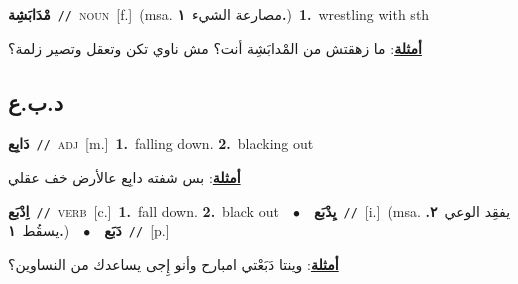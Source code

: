 \documentclass[10pt,a4paper,twoside]{article} %
\begin{document}
\begin{multicols}{2}
{{{{\setlength\topsep{0pt}\textbf{\foreignlanguage{arabic}{مْدَابَشِة}}\ {\color{gray}\texttt{//}\color{black}}\ \textsc{noun}\ [f.]\ \color{gray}(msa. \foreignlanguage{arabic}{مصارعة الشيء}~\foreignlanguage{arabic}{\textbf{١.}})\color{black}\ \textbf{1.}~wrestling with sth\  \begin{flushright}\color{gray}\foreignlanguage{arabic}{\textbf{\underline{\foreignlanguage{arabic}{أمثلة}}}: ما زهقتش من المْدابَشِة أنت؟ مش ناوي تكن وتعقل وتصير زلمة؟}\end{flushright}\color{black}} \vspace{2mm}

\vspace{-3mm}
\subsection*{\color{blue}\foreignlanguage{arabic}{د.ب.ع}\color{blue}{}} 

{\setlength\topsep{0pt}\textbf{\foreignlanguage{arabic}{دَابِع}}\ {\color{gray}\texttt{//}\color{black}}\ \textsc{adj}\ [m.]\ \textbf{1.}~falling down.  \textbf{2.}~blacking out\  \begin{flushright}\color{gray}\foreignlanguage{arabic}{\textbf{\underline{\foreignlanguage{arabic}{أمثلة}}}: بس شفته دابِع عالأرض خف عقلي}\end{flushright}\color{black}} \vspace{2mm}

{\setlength\topsep{0pt}\textbf{\foreignlanguage{arabic}{اِدْبَع}}\ {\color{gray}\texttt{//}\color{black}}\ \textsc{verb}\ [c.]\ \textbf{1.}~fall down.  \textbf{2.}~black out\ \ $\bullet$\ \ \setlength\topsep{0pt}\textbf{\foreignlanguage{arabic}{يِدْبَع}}\ {\color{gray}\texttt{//}\color{black}}\ [i.]\ \color{gray}(msa. \foreignlanguage{arabic}{يفقِد الوعي}~\foreignlanguage{arabic}{\textbf{٢.}}  \foreignlanguage{arabic}{يسقُط}~\foreignlanguage{arabic}{\textbf{١.}})\color{black}\ \ $\bullet$\ \ \setlength\topsep{0pt}\textbf{\foreignlanguage{arabic}{دَبَع}}\ {\color{gray}\texttt{//}\color{black}}\ [p.]\  \begin{flushright}\color{gray}\foreignlanguage{arabic}{\textbf{\underline{\foreignlanguage{arabic}{أمثلة}}}: وينتا دَبَعْتي امبارح وأنو إِجى يساعدك من النساوين؟}\end{flushright}\color{black}} \vspace{2mm}

}}}
\end{multicols}
\end{document}
